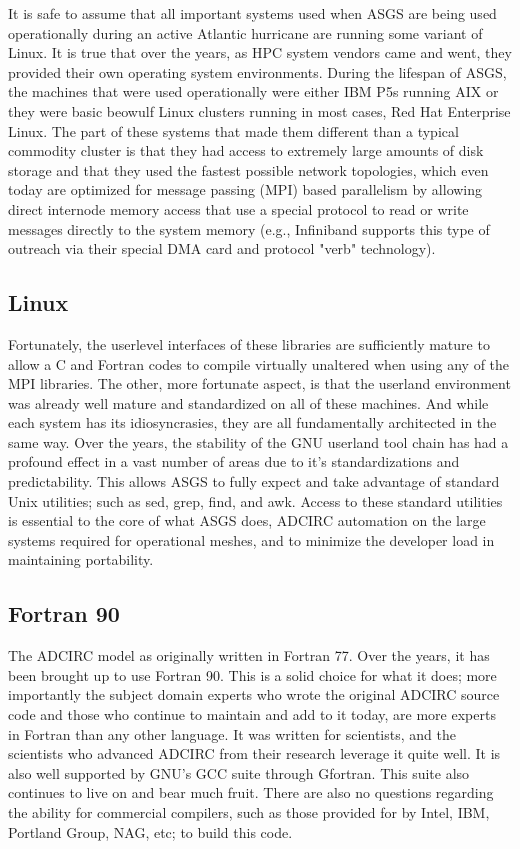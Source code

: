 \documentclass{article}
\begin{document}
It is safe to assume that all important systems used when ASGS are being used
operationally during an active Atlantic hurricane are running some variant of
Linux. It is true that over the years, as HPC system vendors came and went, they
provided their own operating system environments. During the lifespan of ASGS,
the machines that were used operationally were either IBM P5s running AIX or
they were basic beowulf Linux clusters running in most cases, Red Hat Enterprise
Linux. The part of these systems that made them different than a typical
commodity cluster is that they had access to extremely large amounts of disk
storage and that they used the fastest possible network topologies, which even
today are optimized for message passing (MPI) based parallelism by allowing
direct internode memory access that use a special protocol to read or write
messages directly to the system memory (e.g., Infiniband supports this type of
outreach via their special DMA card and protocol "verb" technology).

\subsection{Linux}

Fortunately, the userlevel interfaces of these libraries are sufficiently mature
to allow  a C and Fortran codes to compile virtually unaltered when using any of
the MPI libraries. The other, more fortunate aspect, is that the userland
environment was already well mature and standardized on all of these machines.
And while each system has its idiosyncrasies, they are all fundamentally
architected in the same way.  Over the years, the stability of the GNU userland
tool chain has had a profound effect in a vast number of areas due to it's
standardizations and predictability. This allows ASGS to fully expect and take
advantage of standard Unix utilities; such as sed, grep, find, and awk. Access
to these standard utilities is essential to the core of what ASGS does, ADCIRC
automation on the large systems required for operational meshes, and to minimize
the developer load in maintaining portability.

\subsection{Fortran 90}

The ADCIRC model as originally written in Fortran 77. Over the years, it has
been brought up to use Fortran 90. This is a solid choice for what it does; more
importantly the subject domain experts who wrote the original ADCIRC source code
and those who continue to maintain and add to it today, are more experts in
Fortran than any other language. It was written for scientists, and the
scientists who advanced ADCIRC from their research leverage it quite well. It is
also well supported by GNU's GCC suite through Gfortran. This suite also
continues to live on and bear much fruit. There are also no questions regarding
the ability for commercial compilers, such as those provided for by Intel, IBM,
Portland Group, NAG, etc; to build this code.
\end{document}
